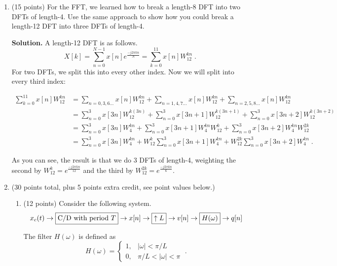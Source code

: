\documentclass[]{siamltex}
\begin{document}
\begin{enumerate}
\begin{enumerate}
\end{enumerate}



\newpage
\item (15 points) For the FFT, we learned how to break a length-8 DFT into two DFTs of length-4. Use the same approach to show how you could break a length-12 DFT into three DFTs of length-4. 

\vspace{1cm}
\textbf{Solution.} A length-12 DFT is as follows. $$X[k] = \sum_{n=0}^{N-1} x[n] e^{\frac{-j2\pi kn}{N}} = \sum_{k=0}^{11} x[n] W_{12}^{kn} \;.$$ For two DFTs, we split this into every other index. Now we will split into every third index: 

\begin{align*}
\sum_{k=0}^{11} x[n] W_{12}^{kn} &= \sum_{n=0, 3, 6...} x[n] W_{12}^{kn} + \sum_{n=1, 4, 7...} x[n] W_{12}^{kn} + \sum_{n=2, 5, 8...} x[n] W_{12}^{kn} \\
&= \sum_{n=0}^3 x[3n] W_{12}^{k(3n)} + \sum_{n=0}^3 x[3n+1] W_{12}^{k(3n+1)} + \sum_{n=0}^3 x[3n+2] W_{12}^{k(3n+2)} \\
&= \sum_{n=0}^3 x[3n] W_{4}^{kn} + \sum_{n=0}^3 x[3n+1] W_{4}^{kn} W_{12}^{k} + \sum_{n=0}^3 x[3n+2] W_{4}^{kn} W_{12}^{2k}\\
&= \sum_{n=0}^3 x[3n] W_{4}^{kn} +W_{12}^{k}  \sum_{n=0}^3 x[3n+1] W_{4}^{kn} + W_{12}^{2k}\sum_{n=0}^3 x[3n+2] W_{4}^{kn} \;.
\end{align*}

As you can see, the result is that we do 3 DFTs of length-4, weighting the second by $W_{12}^{k} = e^{\frac{-j2\pi kn}{12}}$ and the third by $W_{12}^{2k} = e^{\frac{-j2\pi kn}{6}}$.




\newpage

\item (30 points total, plus 5 points extra credit, see point values below.) 
\begin{enumerate}
\item (12 points) Consider the following system. $$x_c(t)  \rightarrow \fbox{C/D with period $T$}  \rightarrow x[n] \rightarrow \fbox{$\uparrow L$}  \rightarrow v[n] \rightarrow \fbox{$H(\omega)$} \rightarrow q[n] $$

The filter $H(\omega)$ is defined as $$H(\omega) = \left\{ \begin{matrix} 1, & |\omega| < \pi/L \\ 0 , & \pi/L < |\omega| < \pi\end{matrix} \right. \;.$$


\end{enumerate}
\end{enumerate}
\end{document}
